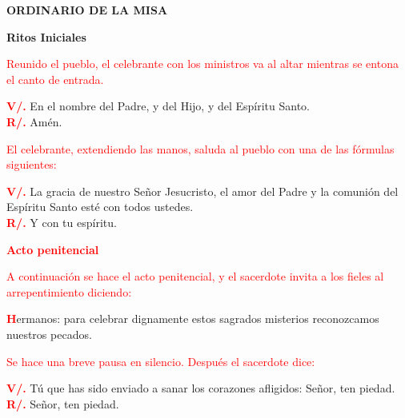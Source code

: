 \documentclass[12pt, letterpaper]{report}
\begin{document}

\begin{center}
\Huge {\bfseries ORDINARIO DE LA MISA}
\end{center}

\begin{center}
\Huge {\bfseries Ritos Iniciales}
\end{center}

\large {\textcolor{red}{Reunido el pueblo, el celebrante con los ministros va al altar mientras se entona el canto de entrada.}}

\noindent
\Large {\bfseries \textcolor{red}{V/.}} \hspace{1cm} {En el nombre del Padre, y del Hijo, \Huge{\textcolor{red}{}} \Large y del Esp\'iritu Santo.}\\
\noindent
\Large{{\bfseries \textcolor{red}{R/.}} \hspace{1cm} Am\'en.}

\large {\textcolor{red}{El celebrante, extendiendo las manos, saluda al pueblo con una de las f\'ormulas siguientes:}}

\noindent
\Large {\bfseries \textcolor{red}{V/.}} \hspace{1cm} La gracia de nuestro Se\~nor Jesucristo, el amor del Padre y la comuni\'on del Esp\'iritu Santo est\'e con todos ustedes.\\
\noindent
{\bfseries \textcolor{red}{R/.}} \hspace{1cm} \Large Y con tu esp\'iritu.

\large {\bfseries \textcolor{red}{Acto penitencial}}

\large {\textcolor{red}{A continuaci\'on se hace el acto penitencial, y el sacerdote invita a los fieles al arrepentimiento
diciendo:}}

\lettrine[lines=2]{\bfseries \textcolor{red}{H}}{}\Large {ermanos: para celebrar dignamente estos sagrados misterios reconozcamos nuestros pecados.}

\large {\textcolor{red}{Se hace una breve pausa en silencio. Despu\'es el sacerdote dice:}}

\noindent
\Large {\bfseries \textcolor{red}{V/.}} \hspace{1cm} T\'u que has sido enviado a sanar los corazones afligidos: Se\~nor, ten piedad.\\
\noindent
\Large {\bfseries \textcolor{red}{R/.}} \hspace{1cm} Se\~nor, ten piedad. 
\end{document}
